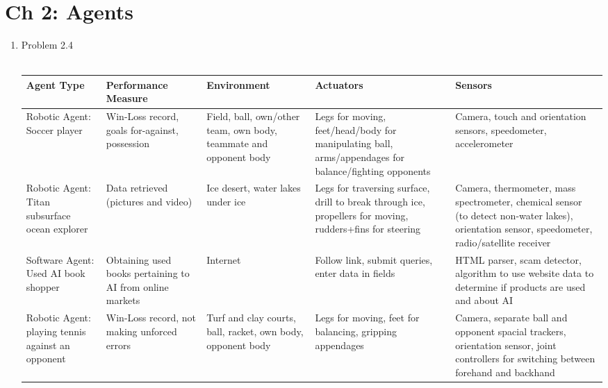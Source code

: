 \documentclass[10pt]{article}
\begin{document}
\newpage

\section*{Ch 2: Agents}
\begin{enumerate}
\item Problem 2.4 \\ \\
    \begin{tabular}{|L||L|L|L|L|}
      \hline  
      \textbf{Agent Type} & \textbf{Performance Measure} & \textbf{Environment} & \textbf{Actuators} & \textbf{Sensors} \\
      \hline
     Robotic Agent: Soccer player & Win-Loss record, goals for-against, possession & Field, ball, own/other team, own body, teammate and opponent body & Legs for moving, feet/head/body for manipulating ball, arms/appendages for balance/fighting opponents & Camera, touch and orientation sensors, speedometer, accelerometer \\
      \hline
      Robotic Agent: Titan subsurface ocean explorer & Data retrieved
                                                       (pictures and
                                                       video) & Ice
                                                                desert,
                                                                water
                                                                lakes
                                                                under
                                                                ice &
                                                                      Legs for traversing surface, drill to break through ice, propellers for moving, rudders+fins for steering & Camera, thermometer, mass spectrometer, chemical sensor (to detect non-water lakes), orientation sensor, speedometer, radio/satellite receiver \\
      \hline
      Software Agent: Used AI book shopper & Obtaining used books pertaining to AI from online markets & Internet & Follow link, submit queries, enter data in fields & HTML parser, scam detector, algorithm to use website data to determine if products are used and about AI \\
      \hline
      Robotic Agent: playing tennis against an opponent & Win-Loss record, not making unforced errors & Turf and clay courts, ball, racket, own body, opponent body & Legs for moving, feet for balancing, gripping appendages & Camera, separate ball and opponent spacial trackers, orientation sensor, joint controllers for switching between forehand and backhand \\

\end{tabular}
\end{enumerate}
\end{document}
